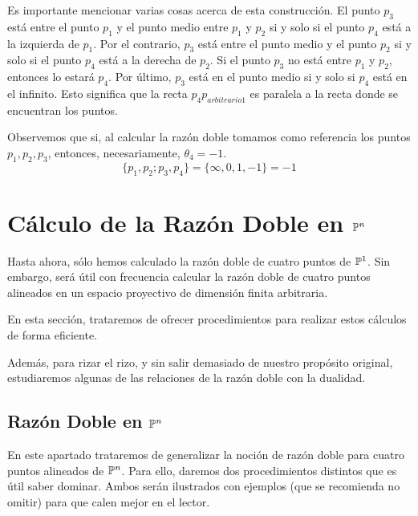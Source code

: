 Es importante mencionar varias cosas acerca de esta construcción. El punto $p_3$ está entre el punto $p_1$ y el punto medio entre $p_1$ y $p_2$ si y solo si el punto $p_4$ está a la izquierda de $p_1$. Por el contrario, $p_3$ está entre el punto medio y el punto $p_2$  si y solo si el punto $p_4$ está a la derecha de $p_2$. Si el punto $p_3$ no está entre $p_1$ y $p_2$, entonces lo estará $p_4$. Por último, $p_3$ está en el punto medio si y solo si $p_4$ está en el infinito. Esto significa que la recta $p_4p_{arbitrario1}$ es paralela a la recta donde se encuentran los puntos.

Observemos que si, al calcular la razón doble tomamos como referencia los puntos $p_1,p_2,p_3$, entonces, necesariamente, $\theta_4=-1$.
\begin{equation*}
	\{p_1,p_2;p_3,p_4\}=\{\infty,0,1,-1\}=-1
\end{equation*}

\section{Cálculo de la Razón Doble en $\mathbb{P}^n$}
\label{C5_generalizacionesRazonDoble}
Hasta ahora, sólo hemos calculado la razón doble de cuatro puntos de $\mathbb{P}^1$. Sin embargo, será útil con frecuencia calcular la razón doble de cuatro puntos alineados en un espacio proyectivo de dimensión finita arbitraria.
 
En esta sección, trataremos de ofrecer procedimientos para realizar estos cálculos de forma eficiente.

Además, para rizar el rizo, y sin salir demasiado de nuestro propósito original, estudiaremos algunas de las relaciones de la razón doble con la dualidad.
\subsection{Razón Doble en $\mathbb{P}^n$}
En este apartado trataremos de generalizar la noción de razón doble para cuatro puntos alineados de $\mathbb{P}^n$. Para ello, daremos dos procedimientos distintos que es útil saber dominar. Ambos serán ilustrados con ejemplos (que se recomienda no omitir) para que calen mejor en el lector.
